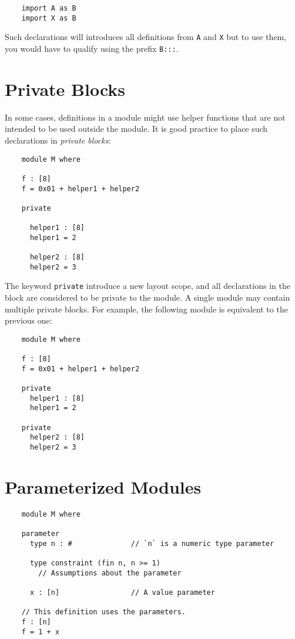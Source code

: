 \begin{verbatim}
    import A as B
    import X as B
\end{verbatim}

Such declarations will introduces all definitions from \texttt{A} and \texttt{X}
but to use them, you would have to qualify using the prefix \texttt{B:::}.


\section{Private Blocks}

In some cases, definitions in a module might use helper
functions that are not intended to be used outside the module.
It is good practice to place such declarations in \textit{private blocks}:


\begin{verbatim}
    module M where

    f : [8]
    f = 0x01 + helper1 + helper2

    private

      helper1 : [8]
      helper1 = 2

      helper2 : [8]
      helper2 = 3
\end{verbatim}

The keyword \texttt{private} introduce a new layout scope, and all declarations
in the block are considered to be private to the module.  A single module
may contain multiple private blocks.  For example, the following module
is equivalent to the previous one:

\begin{verbatim}
    module M where

    f : [8]
    f = 0x01 + helper1 + helper2

    private
      helper1 : [8]
      helper1 = 2

    private
      helper2 : [8]
      helper2 = 3
\end{verbatim}


\section{Parameterized Modules}

\begin{verbatim}
    module M where

    parameter
      type n : #              // `n` is a numeric type parameter

      type constraint (fin n, n >= 1)
        // Assumptions about the parameter

      x : [n]                 // A value parameter

    // This definition uses the parameters.
    f : [n]
    f = 1 + x
\end{verbatim}


